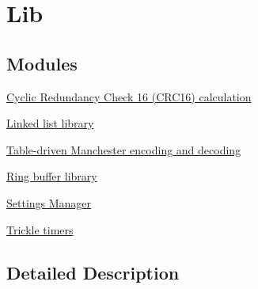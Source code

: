 \hypertarget{group__lib}{}\section{Lib}
\label{group__lib}
\subsection*{Modules}
\begin{DoxyCompactItemize}
\item 
\hyperlink{group__crc16}{Cyclic Redundancy Check 16 (\+C\+R\+C16) calculation}
\item 
\hyperlink{group__list}{Linked list library}
\item 
\hyperlink{group__me}{Table-\/driven Manchester encoding and decoding}
\item 
\hyperlink{group__ringbuf}{Ring buffer library}
\item 
\hyperlink{group__settings__lib}{Settings Manager}
\item 
\hyperlink{group__trickle-timer}{Trickle timers}
\end{DoxyCompactItemize}


\subsection{Detailed Description}
